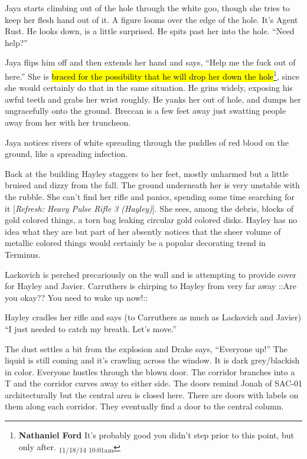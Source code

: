 Jaya starts climbing out of the hole through the white goo, though she tries to keep her flesh hand out of it.  A figure looms over the edge of the hole.  It's Agent Rust.  He looks down, is a little surprised.  He spits past her into the hole.  ``Need help?'' 

Jaya flips him off and then extends her hand and says, ``Help me the fuck out of here.''   She is \hl{braced for the possibility that he will drop her down the hole}\footnote{\textbf{Nathaniel Ford }It's probably good you didn't step prior to this point, but only after. \textsubscript{11/18/14 10:01am}}, since she would certainly do that in the same situation. He grins widely, exposing his awful teeth and grabs her wrist roughly.  He yanks her out of hole, and dumps her ungracefully onto the ground.  Breccan is a few feet away just swatting people away from her with her truncheon.



Jaya notices rivers of white spreading through the puddles of red blood on the ground, like a spreading infection.



Back at the building Hayley staggers to her feet, mostly unharmed but a little bruised and dizzy from the fall.  The ground underneath her is very unstable with the rubble.  She can't find her rifle and panics, spending some time searching for it {[}\textit{Refresh: Heavy Pulse Rifle 3 (Hayley)}{]}.  She sees, among the debris, blocks of gold colored things, a torn bag leaking circular gold colored disks.  Hayley has no idea what they are but part of her absently notices that the sheer volume of metallic colored things would certainly be a popular decorating trend in Terminus.



Lackovich is perched precariously on the wall and is attempting to provide cover for Hayley and Javier.  Carruthers is chirping to Hayley from very far away  {\color[RGB]{153,0,255}::Are you okay?? You need to wake up now!::} 

Hayley cradles her rifle and says (to Carruthers as much as Lackovich and Javier) ``I just needed to catch my breath.  Let's move.''





The dust settles a bit from the explosion and Drake says, ``Everyone up!''  The liquid is still coming and it's crawling across the window.  It is dark grey/blackish in color.  Everyone hustles through the blown door.  The corridor branches into a T and the corridor curves away to either side.  The doors remind Jonah of SAC-01 architecturally but the central area is closed here.  There are doors with labels on them along each corridor.  They eventually find a door to the central column.



